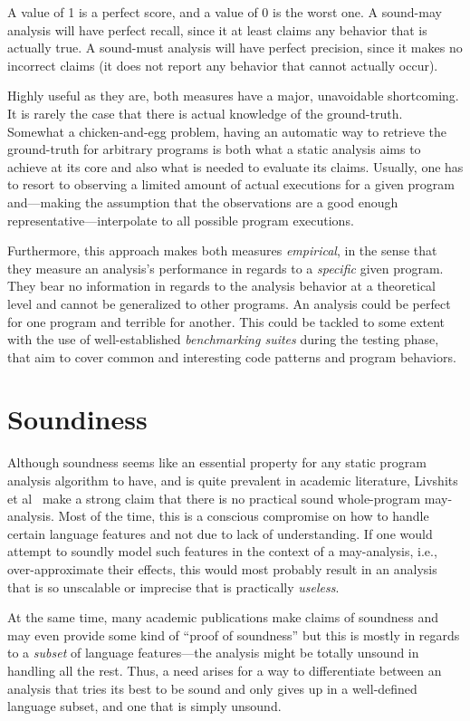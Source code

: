A value of 1 is a perfect score, and a value of 0 is the worst one. A sound-may analysis will have perfect recall, since it at least claims any behavior that is actually true. A sound-must analysis will have perfect precision, since it makes no incorrect claims (it does not report any behavior that cannot actually occur).

Highly useful as they are, both measures have a major, unavoidable shortcoming. It is rarely the case that there is actual knowledge of the ground-truth. Somewhat a chicken-and-egg problem, having an automatic way to retrieve the ground-truth for arbitrary programs is both what a static analysis aims to achieve at its core and also what is needed to evaluate its claims. Usually, one has to resort to observing a limited amount of actual executions for a given program and---making the assumption that the observations are a good enough representative---interpolate to all possible program executions.

Furthermore, this approach makes both measures \emph{empirical}, in the sense that they measure an analysis's performance in regards to a \emph{specific} given program. They bear no information in regards to the analysis behavior at a theoretical level and cannot be generalized to other programs. An analysis could be perfect for one program and terrible for another. This could be tackled to some extent with the use of well-established \emph{benchmarking suites} during the testing phase, that aim to cover common and interesting code patterns and program behaviors.


\section{Soundiness}
\label{sec:back:soundiness}

Although soundness seems like an essential property for any static program analysis algorithm to have, and is quite prevalent in academic literature, Livshits et al~\cite{article:2015:Livshits} make a strong claim that there is no practical sound whole-program may-analysis. Most of the time, this is a conscious compromise on how to handle certain language features and not due to lack of understanding. If one would attempt to soundly model such features in the context of a may-analysis, i.e., over-approximate their effects, this would most probably result in an analysis that is so unscalable or imprecise that is practically \emph{useless}.

At the same time, many academic publications make claims of soundness and may even provide some kind of ``proof of soundness'' but this is mostly in regards to a \emph{subset} of language features---the analysis might be totally unsound in handling all the rest. Thus, a need arises for a way to differentiate between an analysis that tries its best to be sound and only gives up in a well-defined language subset, and one that is simply unsound.

